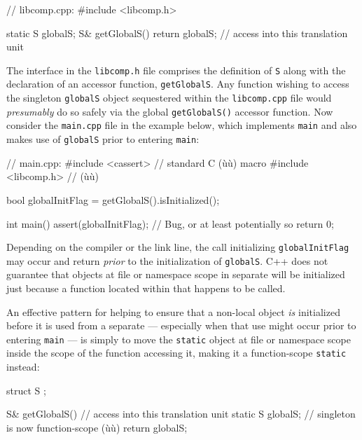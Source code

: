 
\begin{emcppslisting}[emcppsbatch=e7]
// libcomp.cpp:
#include <libcomp.h>

static S globalS;
S& getGlobalS() { return globalS; }  // access into this translation unit
\end{emcppslisting}

\noindent The interface in the \lstinline!libcomp.h! file comprises the definition of
\lstinline!S! along with the declaration of an accessor function,
\lstinline!getGlobalS!. Any function wishing to access the singleton
\lstinline!globalS! object sequestered within the \lstinline!libcomp.cpp! file
would \emph{presumably} do so safely via the global
\lstinline!getGlobalS()! accessor function. Now consider the
\lstinline!main.cpp! file in the example below, which implements
\lstinline!main! and also makes use of \lstinline!globalS! prior to entering
\lstinline!main!:

\begin{emcppslisting}[emcppsbatch=e7]
// main.cpp:
#include <cassert>    // standard C (ù{}ù) macro
#include <libcomp.h>  // (ù{}ù)

bool globalInitFlag = getGlobalS().isInitialized();

int main()
{
    assert(globalInitFlag);   // Bug, or at least potentially so
    return 0;
}
\end{emcppslisting}

\noindent Depending on the compiler or the link line, the call
initializing \lstinline!globalInitFlag! may occur and return \emph{prior}
to the initialization of  \lstinline!globalS!.  C++ does not guarantee that objects at
file or namespace scope in separate  will be
initialized just because a function located within that 
happens to be called.

An effective pattern for helping to ensure that a non-local object
\emph{is} initialized before it is used from a separate 
--- especially when that use might occur prior to entering \lstinline!main!
--- is simply to move the \lstinline!static! object at file or namespace
scope inside the scope of the function accessing it, making it a
function-scope \lstinline!static! instead:

\begin{emcppshiddenlisting}[emcppsbatch=e8]
struct S {
};
\end{emcppshiddenlisting}
\begin{emcppslisting}[emcppsbatch=e8]
S& getGlobalS()  // access into this translation unit
{
    static S globalS;  // singleton is now function-scope (ù{}ù)
    return globalS;
}
\end{emcppslisting}

